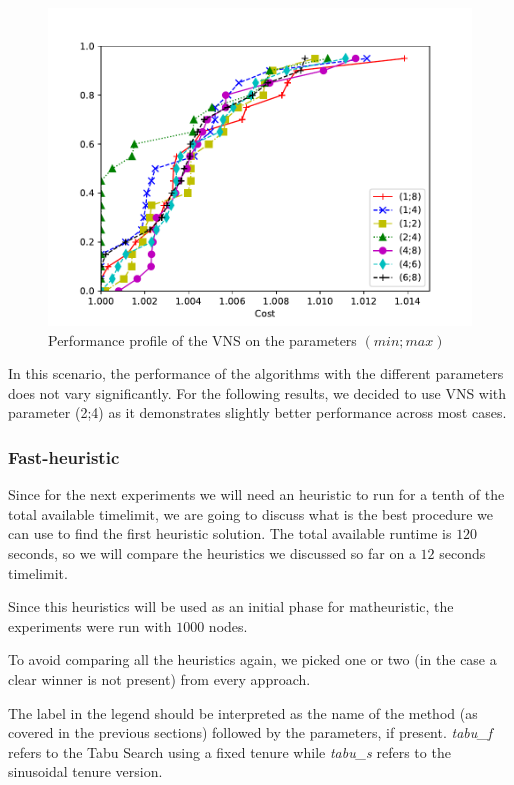\documentclass{article}
\begin{document}
\begin{figure}[ht]
        \caption{Performance profile of the VNS on the parameters $\left(min; max\right)$}
        \label{fig:ht_vns}
        \centering
        \includegraphics[width=340pt]{assets/ht_vns.pdf}
\end{figure}

In this scenario, the performance of the algorithms with the
different parameters does not vary significantly. For the following results, we decided
to use VNS with parameter (2;4) as it demonstrates slightly better performance across most cases.

\clearpage
\subsubsection{Fast-heuristic}
Since for the next experiments we will need an heuristic to run for a tenth of
the total available timelimit, we are going to discuss what is the best
procedure we can use to find the first heuristic solution. The total available
runtime is $120$ seconds, so we will compare the heuristics we discussed so far
on a $12$ seconds timelimit.

Since this heuristics will be used as an initial phase for matheuristic,
the experiments were run with $1000$ nodes.

To avoid comparing all the heuristics again, we picked one or two (in the case
a clear winner is not present) from every approach.

The label in the legend should be interpreted as the name of the method (as
covered in the previous sections) followed by the parameters, if present.
\textit{tabu\_f} refers to the Tabu Search using a fixed tenure while
\textit{tabu\_s} refers to the sinusoidal tenure version.
\end{document}

